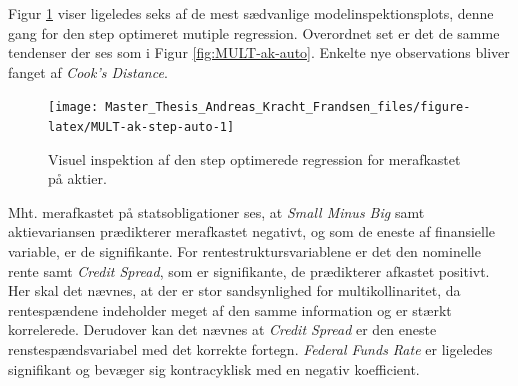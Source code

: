 \documentclass[
  a4paper,
  oneside]{memoir}
\begin{document}
Figur \ref{fig:MULT-ak-step-auto} viser ligeledes seks af de mest sædvanlige modelinspektionsplots, denne gang for den step optimeret mutiple regression. Overordnet set er det de samme tendenser der ses som i Figur \ref{fig:MULT-ak-auto}. Enkelte nye observations bliver fanget af \emph{Cook's Distance}.

\begin{figure}[H]

{\centering \texttt{[image: Master\_Thesis\_Andreas\_Kracht\_Frandsen\_files/figure-latex/MULT-ak-step-auto-1]} 

}

\caption{Visuel inspektion af den step optimerede regression for merafkastet på aktier.}\label{fig:MULT-ak-step-auto}
\end{figure}

Mht. merafkastet på statsobligationer ses, at \emph{Small Minus Big} samt aktievariansen prædikterer merafkastet negativt, og som de eneste af finansielle variable, er de signifikante. For rentestruktursvariablene er det den nominelle rente samt \emph{Credit Spread}, som er signifikante, de prædikterer afkastet positivt. Her skal det nævnes, at der er stor sandsynlighed for multikollinaritet, da rentespændene indeholder meget af den samme information og er stærkt korrelerede. Derudover kan det nævnes at \emph{Credit Spread} er den eneste renstespændsvariabel med det korrekte fortegn. \emph{Federal Funds Rate} er ligeledes signifikant og bevæger sig kontracyklisk med en negativ koefficient.
\end{document}
